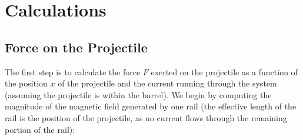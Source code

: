 \documentclass[12pt]{article}
\begin{document}
\section{Calculations}

\subsection{Force on the Projectile}

The first step is to calculate the force $F$ exerted on the projectile as a function of the position $x$ of the projectile and the current running through the system (assuming the projectile is within the barrel). We begin by computing the magnitude of the magnetic field generated by one rail (the effective length of the rail is the position of the projectile, as no current flows through the remaining portion of the rail): \\

\begin{center}
\end{center}
\end{document}

